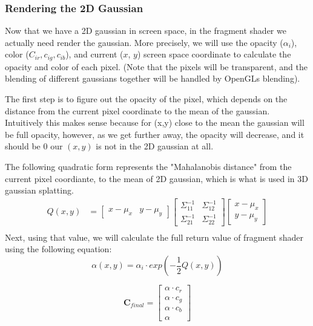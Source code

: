 \documentclass {article}
\begin{document}
     \subsubsection{Rendering the 2D Gaussian}

     Now that we have a 2D gaussian in screen space, in the fragment shader we actually need render the gaussian. More precisely, we will use the opacity ($\alpha_i$), color ($C_{ir}, c_{ig}, c_{ib}$), and current ($x$, $y$) screen space coordinate to calculate the opacity and color of each pixel. (Note that the pixels will be transparent, and the blending of different gaussians together will be handled by OpenGLs blending).

     The first step is to figure out the opacity of the pixel, which depends on the distance from the current pixel coordinate to the mean of the gaussian. Intuitively this makes sense because for (x,y) close to the mean the gaussian will be full opacity, however, as we get further away, the opacity will decrease, and it should be 0 our $(x, y)$ is not in the 2D gaussian at all. 

      The following quadratic form represents the "Mahalanobis distance" from the current pixel coordiante, to the mean of 2D gaussian, which is what is used in 3D gaussian splatting.
          \begin{align*}
               Q(x, y) &= \begin{bmatrix}x - \mu_x & y - \mu_y\end{bmatrix}
               \begin{bmatrix}
               \Sigma^{-1}_{11} & \Sigma^{-1}_{12} \\
               \Sigma^{-1}_{21} & \Sigma^{-1}_{22}
               \end{bmatrix}
               \begin{bmatrix}x - \mu_x \\ y - \mu_y\end{bmatrix} \\
          \end{align*}
          Next, using that value, we will calculate the full return value of fragment shader using the following equation:
               $$\alpha(x, y) = \alpha_i \cdot exp(-\frac{1}{2}Q(x, y))$$ 

               $$\mathbf{C}_{final} = \begin{bmatrix}
                    \alpha \cdot c_r \\
                    \alpha \cdot c_g \\
                    \alpha \cdot c_b \\
                    \alpha
                    \end{bmatrix}$$
\end{document}
